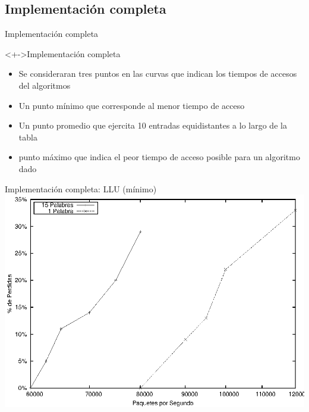 \documentclass[xcolor=dvipsnames]{beamer}
\begin{document}
\subsection{Implementación completa}
\begin{frame}{Implementación completa} 
 \begin{block}<+->{Implementación completa}   
    \begin{itemize}
      \scriptsize
     	\item Se consideraran tres puntos en las curvas que indican los tiempos de accesos del algoritmos
     	\item Un punto mínimo que corresponde al menor tiempo de acceso
	\item Un punto promedio que ejercita 10 entradas equidistantes a lo largo de la tabla
	\item punto máximo que indica el peor tiempo de acceso posible para un algoritmo dado	
    \end{itemize}
  \end{block}
\end{frame}

\begin{frame}{Implementación completa: LLU (mínimo)} 
\center	
\includegraphics[scale=0.70]{figures/llumin.eps} 
\end{frame}
\end{document}
